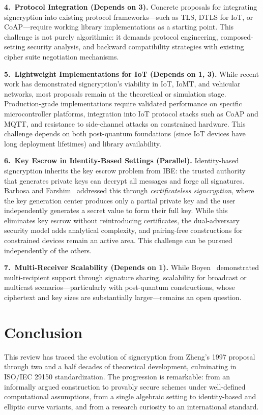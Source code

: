 \documentclass[conference]{IEEEtran}
\begin{document}
\textbf{4.\ Protocol Integration (Depends on 3).} Concrete proposals for integrating signcryption into existing protocol frameworks---such as TLS, DTLS for IoT, or CoAP---require working library implementations as a starting point. This challenge is not purely algorithmic: it demands protocol engineering, composed-setting security analysis, and backward compatibility strategies with existing cipher suite negotiation mechanisms.

\textbf{5.\ Lightweight Implementations for IoT (Depends on 1, 3).} While recent work has demonstrated signcryption's viability in IoT, IoMT, and vehicular networks, most proposals remain at the theoretical or simulation stage. Production-grade implementations require validated performance on specific microcontroller platforms, integration into IoT protocol stacks such as CoAP and MQTT, and resistance to side-channel attacks on constrained hardware. This challenge depends on both post-quantum foundations (since IoT devices have long deployment lifetimes) and library availability.

\textbf{6.\ Key Escrow in Identity-Based Settings (Parallel).} Identity-based signcryption inherits the key escrow problem from IBE: the trusted authority that generates private keys can decrypt all messages and forge all signatures. Barbosa and Farshim~\cite{barbosa2008} addressed this through \textit{certificateless signcryption}, where the key generation center produces only a partial private key and the user independently generates a secret value to form their full key. While this eliminates key escrow without reintroducing certificates, the dual-adversary security model adds analytical complexity, and pairing-free constructions for constrained devices remain an active area. This challenge can be pursued independently of the others.

\textbf{7.\ Multi-Receiver Scalability (Depends on 1).} While Boyen~\cite{boyen2003} demonstrated multi-recipient support through signature sharing, scalability for broadcast or multicast scenarios---particularly with post-quantum constructions, whose ciphertext and key sizes are substantially larger---remains an open question.

\section{Conclusion}

This review has traced the evolution of signcryption from Zheng's 1997 proposal through two and a half decades of theoretical development, culminating in ISO/IEC 29150 standardization. The progression is remarkable: from an informally argued construction to provably secure schemes under well-defined computational assumptions, from a single algebraic setting to identity-based and elliptic curve variants, and from a research curiosity to an international standard.
\end{document}
